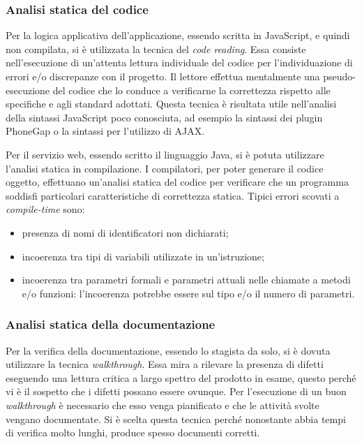 \subsubsection{Analisi statica del codice}


Per la logica applicativa dell'applicazione, essendo scritta in JavaScript, e quindi non compilata, si è utilizzata la tecnica del \textit{code reading}. Essa consiste nell'esecuzione di un'attenta lettura individuale del codice per l'individuazione di errori e/o discrepanze con il progetto. Il lettore effettua mentalmente una pseudo-esecuzione del codice che lo conduce a verificarne la correttezza rispetto alle specifiche e agli standard adottati. Questa tecnica è risultata utile nell'analisi della sintassi JavaScript poco conosciuta, ad esempio la sintassi dei plugin PhoneGap o la sintassi per l'utilizzo di AJAX.


Per il servizio web, essendo scritto il linguaggio Java, si è potuta utilizzare l'analisi statica in compilazione. I compilatori, per poter generare il codice oggetto, effettuano un'analisi statica del codice per verificare che un programma soddisfi particolari caratteristiche di correttezza statica. Tipici errori scovati a \textit{compile-time} sono:
\begin{itemize}
	\item presenza di nomi di identificatori non dichiarati;
	\item incoerenza tra tipi di variabili utilizzate in un'istruzione;
	\item incoerenza tra parametri formali e parametri attuali nelle chiamate a metodi e/o funzioni: l'incoerenza potrebbe essere sul tipo e/o il numero di parametri.
\end{itemize}

\subsubsection{Analisi statica della documentazione}

Per la verifica della documentazione, essendo lo stagista da solo, si è dovuta utilizzare la tecnica \textit{walkthrough}. Essa mira a rilevare la presenza di difetti eseguendo una lettura critica a largo spettro del prodotto in esame, questo perché vi è il sospetto che i difetti possano essere ovunque. Per l'esecuzione di un buon \textit{walkthrough} è necessario che esso venga pianificato e che le attività svolte vengano documentate. Si è scelta questa tecnica perché nonostante abbia tempi di verifica molto lunghi, produce spesso documenti corretti.

